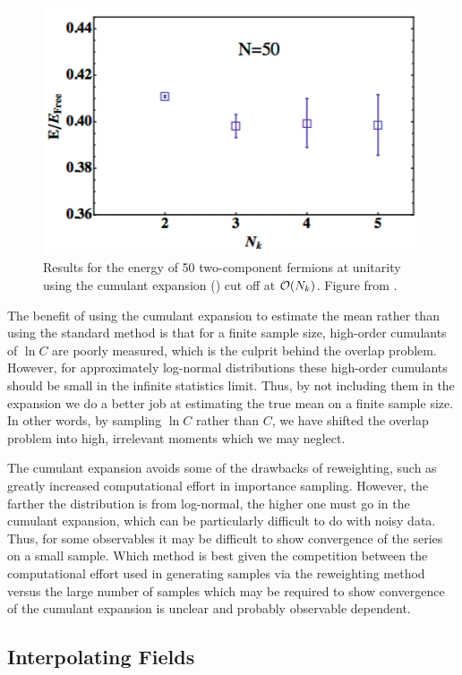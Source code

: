 \begin{figure}
\caption{\label{fig:cumulant} Results for the energy of 50 two-component fermions at unitarity using the cumulant expansion () cut off at ${\mathcal{ O}}(N_k)$. Figure from \cite{EKLN4}.}
\includegraphics[width=0.5\linewidth]{Chapter5-figures/cumulant}
\end{figure}

The benefit of using the cumulant expansion to estimate the mean rather than using the standard method is that for a finite sample size, high-order cumulants of $\ln C$ are poorly measured, which is the culprit behind the overlap problem. However, for approximately log-normal distributions these high-order cumulants should be small in the infinite statistics limit. Thus, by not including them in the expansion we do a better job at estimating the true mean on a finite sample size. In other words, by sampling $\ln C$ rather than $C$, we have shifted the overlap problem into high, irrelevant moments which we may neglect.

The cumulant expansion avoids some of the drawbacks of reweighting, such as greatly increased computational effort in importance sampling. However, the farther the distribution is from log-normal, the higher one must go in the cumulant expansion, which can be particularly difficult to do with noisy data. Thus, for some observables it may be difficult to show convergence of the series on a small sample. Which method is best given the competition between the computational effort used in generating samples via the reweighting method versus the large number of samples which may be required to show convergence of the cumulant expansion is unclear and probably observable dependent. 

\subsection{\label{sec:interp}Interpolating Fields}

